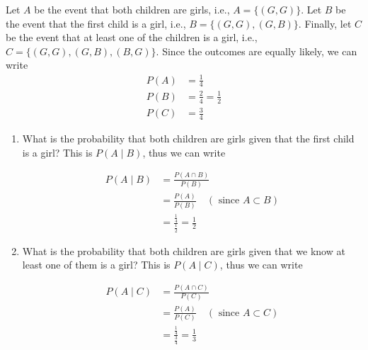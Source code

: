 \begin{solution}
    Let $A$ be the event that both children are girls, i.e., $A=\{(G, G)\}$. Let $B$ be the event that the first child is a girl, i.e., $B=\{(G, G),(G, B)\}$. Finally, let $C$ be the event that at least one of the children is a girl, i.e., $C=\{(G, G),(G, B),(B, G)\}$. Since the outcomes are equally likely, we can write
    \begin{align*}
    P(A) &= \frac{1}{4} \\
    P(B) &= \frac{2}{4} = \frac{1}{2} \\
    P(C) &= \frac{3}{4}
    \end{align*}


    \begin{enumerate}[label=(\alph*)]
         \item What is the probability that both children are girls given that the first child is a girl? This is $P(A \mid B)$, thus we can write

                    \begin{align*}
                    P(A \mid B) & =\frac{P(A \cap B)}{P(B)} \\
                    & =\frac{P(A)}{P(B)} \quad(\text { since } A \subset B) \\
                    & =\frac{\frac{1}{4}}{\frac{1}{2}}=\frac{1}{2}
                    \end{align*}

                \item What is the probability that both children are girls given that we know at least one of them is a girl? This is $P(A \mid C)$, thus we can write

                    \begin{align*}
                    P(A \mid C) & =\frac{P(A \cap C)}{P(C)} \\
                    & =\frac{P(A)}{P(C)} \quad(\text { since } A \subset C) \\
                    & =\frac{\frac{1}{4}}{\frac{3}{4}}=\frac{1}{3}
                    \end{align*}

    \end{enumerate}
\leavevmode\end{solution}

